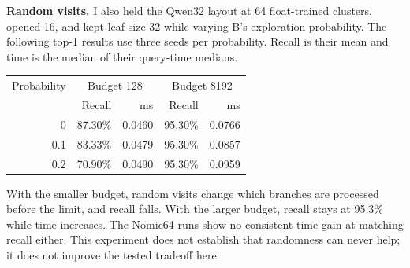 \textbf{Random visits.}
I also held the Qwen32 layout at 64 float-trained clusters, opened 16, and kept leaf size 32 while varying B's exploration probability. The following top-1 results use three seeds per probability. Recall is their mean and time is the median of their query-time medians.

\begin{center}\small
\begin{tabular}{@{}rrrrr@{}}\toprule
Probability & \multicolumn{2}{c}{Budget 128} & \multicolumn{2}{c}{Budget 8192}\\
 & Recall & ms & Recall & ms\\\midrule
0 & 87.30\% & 0.0460 & 95.30\% & 0.0766\\
0.1 & 83.33\% & 0.0479 & 95.30\% & 0.0857\\
0.2 & 70.90\% & 0.0490 & 95.30\% & 0.0959\\\bottomrule
\end{tabular}
\end{center}
With the smaller budget, random visits change which branches are processed before the limit, and recall falls. With the larger budget, recall stays at 95.3\% while time increases. The Nomic64 runs show no consistent time gain at matching recall either. This experiment does not establish that randomness can never help; it does not improve the tested tradeoff here.
